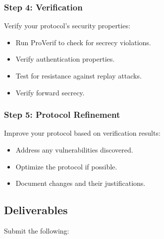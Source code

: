 \documentclass[10pt,a4paper,american]{exam}
\begin{document}
\subsubsection*{Step 4: Verification}
Verify your protocol's security properties:
\begin{itemize}
	\item Run ProVerif to check for secrecy violations.
	\item Verify authentication properties.
	\item Test for resistance against replay attacks.
	\item Verify forward secrecy.
\end{itemize}

\subsubsection*{Step 5: Protocol Refinement}
Improve your protocol based on verification results:
\begin{itemize}
	\item Address any vulnerabilities discovered.
	\item Optimize the protocol if possible.
	\item Document changes and their justifications.
\end{itemize}

\subsection*{Deliverables}
Submit the following:
\end{document}
